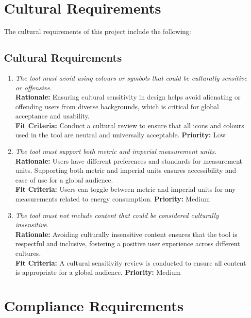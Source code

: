 \documentclass[12pt]{article}
\begin{document}
\section{Cultural Requirements}
The cultural requirements of this project include the following:
\subsection{Cultural Requirements}
\begin{enumerate}[label=CULT \arabic*., wide=0pt, leftmargin=*]
  \item \emph{The tool must avoid using colours or symbols that could
    be culturally sensitive or offensive.}\\
    {\bf Rationale:} Ensuring cultural sensitivity in design helps
    avoid alienating or offending users from diverse backgrounds,
    which is critical for global acceptance and usability.\\
    {\bf Fit Criteria:} Conduct a cultural review to ensure that all
    icons and colours used in the tool are neutral and universally acceptable.
    {\bf Priority:} Low

  \item \emph{The tool must support both metric and imperial
    measurement units.}\\
    {\bf Rationale:} Users have different preferences and standards
    for measurement units. Supporting both metric and imperial units
    ensures accessibility and ease of use for a global audience.\\
    {\bf Fit Criteria:} Users can toggle between metric and imperial
    units for any measurements related to energy consumption.
    {\bf Priority:} Medium

  \item \emph{The tool must not include content that could be
    considered culturally insensitive.}\\
    {\bf Rationale:} Avoiding culturally insensitive content ensures
    that the tool is respectful and inclusive, fostering a positive
    user experience across different cultures.\\
    {\bf Fit Criteria:} A cultural sensitivity review is conducted to
    ensure all content is appropriate for a global audience.
    {\bf Priority:} Medium

\end{enumerate}

\section{Compliance Requirements}
\end{document}
